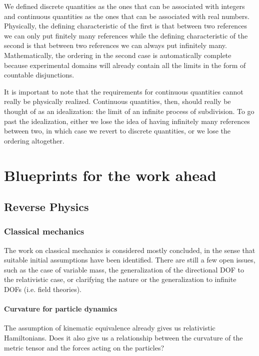 \documentclass[11pt,letterpaper,fleqn]{memoir} %
\begin{document}
We defined discrete quantities as the ones that can be associated with integers and continuous quantities as the ones that can be associated with real numbers. Physically, the defining characteristic of the first is that between two references we can only put finitely many references while the defining characteristic of the second is that between two references we can always put infinitely many. Mathematically, the ordering in the second case is automatically complete because experimental domains will already contain all the limits in the form of countable disjunctions.

It is important to note that the requirements for continuous quantities cannot really be physically realized. Continuous quantities, then, should really be thought of as an idealization: the limit of an infinite process of subdivision. To go past the idealization, either we lose the idea of having infinitely many references between two, in which case we revert to discrete quantities, or we lose the ordering altogether.

\part{Blueprints for the work ahead}

\chapter{Reverse Physics}

\section{Classical mechanics}

The work on classical mechanics is considered mostly concluded, in the sense that suitable initial assumptions have been identified. There are still a few open issues, such as the case of variable mass, the generalization of the directional DOF to the relativistic case, or clarifying the nature or the generalization to infinite DOFs (i.e. field theories).

\subsection{Curvature for particle dynamics}

The assumption of kinematic equivalence already gives us relativistic Hamiltonians. Does it also give us a relationship between the curvature of the metric tensor and the forces acting on the particles?
\end{document}
